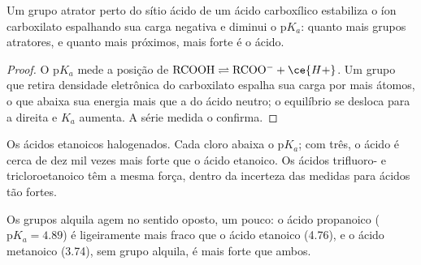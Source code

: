 \begin{proposition}\label{prop:b1:electronic-effects:inductive-pka}
Um grupo atrator perto do sítio ácido de um ácido carboxílico estabiliza
o íon carboxilato espalhando sua carga negativa e diminui o
$\mathrm{p}K_a$: quanto mais grupos atratores, e quanto mais próximos,
mais forte é o ácido.
\end{proposition}

\begin{proof}
O $\mathrm{p}K_a$ mede a posição de $\mathrm{RCOOH} \rightleftharpoons
\mathrm{RCOO^-} + \ce{H+}$. Um grupo que retira densidade eletrônica do
carboxilato espalha sua carga por mais átomos, o que abaixa sua energia
mais que a do ácido neutro; o equilíbrio se desloca para a direita e
$K_a$ aumenta. A série medida o confirma.
\end{proof}

\begin{omfigure}

{\small Os ácidos etanoicos halogenados. Cada cloro abaixa o
$\mathrm{p}K_a$; com três, o ácido é cerca de dez mil vezes mais forte
que o ácido etanoico. Os ácidos trifluoro- e tricloroetanoico têm a
mesma força, dentro da incerteza das medidas para ácidos tão fortes.}
\end{omfigure}

Os grupos alquila agem no sentido oposto, um pouco: o ácido propanoico
($\mathrm{p}K_a
= 4.89$) é ligeiramente mais fraco que o ácido etanoico (4.76), e o
ácido metanoico (3.74), sem grupo alquila, é mais forte que ambos.

